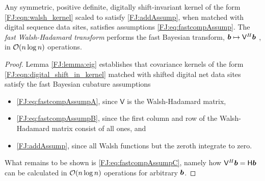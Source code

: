 \documentclass[graybox,footinfo]{svmult}
\begin{document}
\begin{theorem} \label{FJ:thm:main}
	Any symmetric, positive definite, digitally shift-invariant kernel of the form \eqref{FJ:eqn:walsh_kernel} scaled to satisfy \eqref{FJ:addAssump}, when matched with digital sequence data sites, satisfies assumptions \eqref{FJ:eq:fastcompAssump}.  The \emph{fast Walsh-Hadamard transform} performs the fast Bayesian transform,  ${\boldsymbol{b}} \mapsto \mathsf{V}^H {\boldsymbol{b}}$ , in ${\mathcal{O}}(n \log n)$ operations.
\end{theorem}

\begin{proof}{
Lemma \ref{FJ:lemma:eig} establishes that covariance kernels of the form \eqref{FJ:eqn:digital_shift_in_kernel} matched with shifted digital net data sites satisfy the fast Bayesian cubature assumptions
\begin{itemize}
    \item \eqref{FJ:eq:fastcompAssumpA}, since $\mathsf{V}$ is the Walsh-Hadamard matrix,
    
    \item  \eqref{FJ:eq:fastcompAssumpB}, since the first column and row of the  Walsh-Hadamard matrix consist of all ones, and
    
    \item \eqref{FJ:addAssump}, since all Walsh functions but the zeroth integrate to zero.
\end{itemize}
What remains to be shown is \eqref{FJ:eq:fastcompAssumpC}, namely how $\mathsf{V}^H {\boldsymbol{b}} = \mathsf{H} {\boldsymbol{b}}$ can be calculated in ${\mathcal{O}}(n \log{n})$ operations for arbitrary ${\boldsymbol{b}}$.

}
\end{proof}
\end{document}
